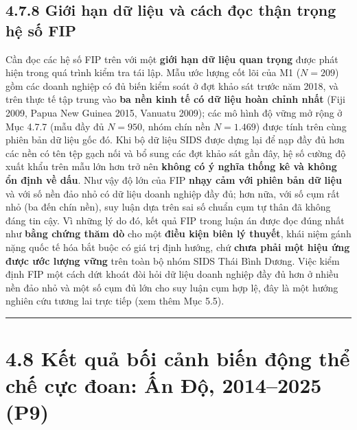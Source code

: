\documentclass[
  a4paper,
  13pt]{extreport}
\begin{document}
\hypertarget{giux1edbi-hux1ea1n-dux1eef-liux1ec7u-vuxe0-cuxe1ch-ux111ux1ecdc-thux1eadn-trux1ecdng-hux1ec7-sux1ed1-fip}{%
\subsection{4.7.8 Giới hạn dữ liệu và cách đọc thận trọng hệ số
FIP}\label{giux1edbi-hux1ea1n-dux1eef-liux1ec7u-vuxe0-cuxe1ch-ux111ux1ecdc-thux1eadn-trux1ecdng-hux1ec7-sux1ed1-fip}}

Cần đọc các hệ số FIP trên với một \textbf{giới hạn dữ liệu quan trọng}
được phát hiện trong quá trình kiểm tra tái lập. Mẫu ước lượng cốt lõi
của M1 (\(N = 209\)) gồm các doanh nghiệp có đủ biến kiểm soát ở đợt
khảo sát trước năm 2018, và trên thực tế tập trung vào \textbf{ba nền
kinh tế có dữ liệu hoàn chỉnh nhất} (Fiji 2009, Papua New Guinea 2015,
Vanuatu 2009); các mô hình độ vững mở rộng ở Mục 4.7.7 (mẫu đầy đủ
\(N = 950\), nhóm chín nền \(N = 1.469\)) được tính trên cùng phiên bản
dữ liệu gốc đó. Khi bộ dữ liệu SIDS được dựng lại để nạp đầy đủ hơn các
nền có tên tệp gạch nối và bổ sung các đợt khảo sát gần đây, hệ số cường
độ xuất khẩu trên mẫu lớn hơn trở nên \textbf{không có ý nghĩa thống kê
và không ổn định về dấu}. Như vậy độ lớn của FIP \textbf{nhạy cảm với
phiên bản dữ liệu} và với số nền đảo nhỏ có dữ liệu doanh nghiệp đầy đủ;
hơn nữa, với số cụm rất nhỏ (ba đến chín nền), suy luận dựa trên sai số
chuẩn cụm tự thân đã không đáng tin cậy. Vì những lý do đó, kết quả FIP
trong luận án được đọc đúng nhất như \textbf{bằng chứng thăm dò} cho một
\textbf{điều kiện biên lý thuyết}, khái niệm gánh nặng quốc tế hóa bắt
buộc có giá trị định hướng, chứ \textbf{chưa phải một hiệu ứng được ước
lượng vững} trên toàn bộ nhóm SIDS Thái Bình Dương. Việc kiểm định FIP
một cách dứt khoát đòi hỏi dữ liệu doanh nghiệp đầy đủ hơn ở nhiều nền
đảo nhỏ và một số cụm đủ lớn cho suy luận cụm hợp lệ, đây là một hướng
nghiên cứu tương lai trực tiếp (xem thêm Mục 5.5).

\begin{center}\rule{0.5\linewidth}{0.5pt}\end{center}

\hypertarget{kux1ebft-quux1ea3-bux1ed1i-cux1ea3nh-biux1ebfn-ux111ux1ed9ng-thux1ec3-chux1ebf-cux1ef1c-ux111oan-ux1ea5n-ux111ux1ed9-20142025-p9}{%
\section{4.8 Kết quả bối cảnh biến động thể chế cực đoan: Ấn Độ,
2014--2025
(P9)}\label{kux1ebft-quux1ea3-bux1ed1i-cux1ea3nh-biux1ebfn-ux111ux1ed9ng-thux1ec3-chux1ebf-cux1ef1c-ux111oan-ux1ea5n-ux111ux1ed9-20142025-p9}}
\end{document}
